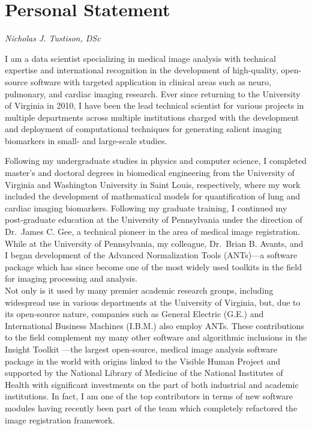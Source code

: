 \documentclass[12pt,]{article}
\title{}
\author{}
\date{}
\begin{document}
\maketitle


\section{Personal Statement}\label{personal-statement}

\emph{Nicholas J. Tustison, DSc}

I am a data scientist specializing in medical image analysis with
technical expertise and international recognition in the development of
high-quality, open-source software with targeted application in clinical
areas such as neuro, pulmonary, and cardiac imaging research. Ever since
returning to the University of Virginia in 2010, I have been the lead
technical scientist for various projects in multiple departments across
multiple institutions charged with the development and deployment of
computational techniques for generating salient imaging biomarkers in
small- and large-scale studies.

Following my undergraduate studies in physics and computer science, I
completed master's and doctoral degrees in biomedical engineering from
the University of Virginia and Washington University in Saint Louis,
respectively, where my work included the development of mathematical
models for quantification of lung and cardiac imaging biomarkers.
Following my graduate training, I continued my post-graduate education
at the University of Pennsylvania under the direction of Dr.~James C.
Gee, a technical pioneer in the area of medical image registration.
While at the University of Pennsylvania, my colleague, Dr.~Brian B.
Avants, and I began development of the Advanced Normalization Tools
(ANTs)---a software package which has since become one of the most
widely used toolkits in the field for imaging processing and analysis.\\
Not only is it used by many premier academic research groups, including
widespread use in various departments at the University of Virginia,
but, due to its open-source nature, companies such as General Electric
(G.E.) and International Business Machines (I.B.M.) also employ ANTs.
These contributions to the field complement my many other software and
algorithmic inclusions in the Insight Toolkit ---the largest
open-source, medical image analysis software package in the world with
origins linked to the Visible Human Project and supported by the
National Library of Medicine of the National Institutes of Health with
significant investments on the part of both industrial and academic
institutions. In fact, I am one of the top contributors in terms of new
software modules having recently been part of the team which completely
refactored the image registration framework.
\end{document}
